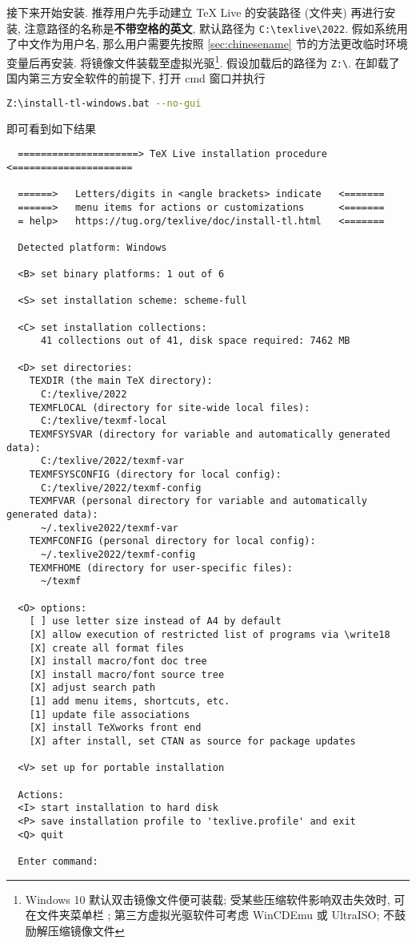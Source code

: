接下来开始安装.
推荐用户先手动建立 \TeX{} Live 的安装路径 (文件夹) 再进行安装,
注意路径的名称是\textbf{不带空格的英文},
默认路径为 \texttt{C:\textbackslash texlive\textbackslash 2022}.
假如系统用了中文作为用户名,
那么用户需要先按照 \ref{sec:chinesename} 节的方法更改临时环境变量后再安装.
将镜像文件装载至虚拟光驱\footnote{Windows 10 默认双击镜像文件便可装载;
受某些压缩软件影响双击失效时,
可在文件夹菜单栏
;
第三方虚拟光驱软件可考虑 WinCDEmu 或 UltraISO;
不鼓励解压缩镜像文件}. 
假设加载后的路径为 \texttt{Z:\textbackslash}.
在卸载了国内第三方安全软件的前提下,
打开 \textsf{cmd} 窗口并执行
\begin{lstlisting}[language = bash]
  Z:\install-tl-windows.bat --no-gui
\end{lstlisting}
即可看到如下结果
\begin{lstlisting}
  =====================> TeX Live installation procedure <=====================
  
  ======>   Letters/digits in <angle brackets> indicate   <=======
  ======>   menu items for actions or customizations      <=======
  = help>   https://tug.org/texlive/doc/install-tl.html   <=======
  
  Detected platform: Windows
  
  <B> set binary platforms: 1 out of 6
  
  <S> set installation scheme: scheme-full
  
  <C> set installation collections:
      41 collections out of 41, disk space required: 7462 MB
  
  <D> set directories:
    TEXDIR (the main TeX directory):
      C:/texlive/2022
    TEXMFLOCAL (directory for site-wide local files):
      C:/texlive/texmf-local
    TEXMFSYSVAR (directory for variable and automatically generated data):
      C:/texlive/2022/texmf-var
    TEXMFSYSCONFIG (directory for local config):
      C:/texlive/2022/texmf-config
    TEXMFVAR (personal directory for variable and automatically generated data):
      ~/.texlive2022/texmf-var
    TEXMFCONFIG (personal directory for local config):
      ~/.texlive2022/texmf-config
    TEXMFHOME (directory for user-specific files):
      ~/texmf
  
  <O> options:
    [ ] use letter size instead of A4 by default
    [X] allow execution of restricted list of programs via \write18
    [X] create all format files
    [X] install macro/font doc tree
    [X] install macro/font source tree
    [X] adjust search path
    [1] add menu items, shortcuts, etc.
    [1] update file associations
    [X] install TeXworks front end
    [X] after install, set CTAN as source for package updates
  
  <V> set up for portable installation
  
  Actions:
  <I> start installation to hard disk
  <P> save installation profile to 'texlive.profile' and exit
  <Q> quit
  
  Enter command:
\end{lstlisting}
